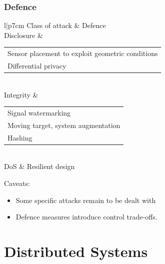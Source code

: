 \documentclass[presentation]{beamer}
\begin{document}
\begin{frame}
	\frametitle{Defence}
	\centering\footnotesize
	\renewcommand{\arraystretch}{1.5}
	\begin{tabular}{l|p{7cm}}
		Class of attack & Defence \\
		\hline
		Disclosure & 
		\renewcommand{\arraystretch}{1.2}
		\begin{tabular}{p{6cm}}			
			\tabitem Sensor placement to exploit geometric conditions \\  \tabitem Differential privacy
		\end{tabular} \\
		\hline 
		Integrity & 
		\renewcommand{\arraystretch}{1.2}
		\begin{tabular}{l}
			\tabitem Signal watermarking \\ 
			\tabitem Moving target, system augmentation \\
			\tabitem Hashing
		\end{tabular} \\
		\hline
		DoS & Resilient design
	\end{tabular}

	\raggedright\vfill
	Caveats:
	\begin{itemize}
		\item Some specific attacks remain to be dealt with
		\item Defence measures introduce control trade-offs.
	\end{itemize}
\end{frame}

\section{Distributed Systems}
\end{document}
